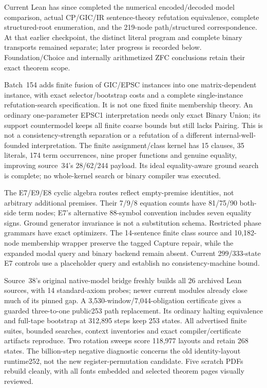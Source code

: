 \documentclass[11pt]{article}
\begin{document}
{Current Lean has since completed the numerical encoded/decoded model
comparison, actual CP/GIC/IR sentence-theory refutation equivalence, complete
structured-root enumeration, and the 219-node path/structured correspondence.
At that earlier checkpoint, the distinct literal program and complete binary
transports remained separate; later progress is recorded below. Foundation/Choice
and internally arithmetized ZFC conclusions retain their exact theorem scope.

Batch~154 adds finite fusion of GIC/EPSC instances into one matrix-dependent
instance, with exact selector/bootstrap costs and a complete single-instance
refutation-search specification. It is not one fixed finite membership theory.
An ordinary one-parameter EPSC1 interpretation needs only exact Binary Union;
its support countermodel keeps all finite coarse bounds but still lacks Pairing.
This is not a consistency-strength separation or a refutation of a different
internal-well-founded interpretation. The finite assignment/class kernel has
15 clauses, 35 literals, 174 term occurrences, nine proper functions and genuine
equality, improving source~34's 28/62/244 payload. Its ideal equality-aware ground
search is complete; no whole-kernel search or binary compiler was executed.

The E7/E9/E8 cyclic algebra routes reflect empty-premise identities, not arbitrary
additional premises. Their 7/9/8 equation counts have 81/75/90 both-side term
nodes; E7's alternative 88-symbol convention includes seven equality signs.
Ground generator invariance is not a substitution schema. Restricted phase
grammars have exact optimizers. The 14-sentence finite class source and
10,182-node membership wrapper preserve the tagged Capture repair, while the
expanded modal query and binary backend remain absent. Current 299/333-state
E7 controls use a placeholder query and establish no consistency-machine bound.

Source~38's original native-model bridge freshly builds all 26 archived Lean
sources, with 14 standard-axiom probes; newer current modules already close much
of its pinned gap. A 3,530-window/7,044-obligation certificate gives a guarded
three-to-one public253 path replacement. Its ordinary halting equivalence and
full-tape bootstrap at 312,895 steps keep 253 states. All advertised finite suites,
bounded searches, context inventories and exact compiler/certificate artifacts
reproduce. Two rotation sweeps score 118,977 layouts and retain 268 states.
The billion-step negative diagnostic concerns the old identity-layout runtime252,
not the new register-permutation candidate. Five scratch PDFs rebuild cleanly,
with all fonts embedded and selected theorem pages visually reviewed.

}
\end{document}
